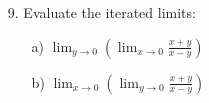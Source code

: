 \documentclass[11pt]{amsbook}
\begin{document}
\begin{enumerate}
            
    \item[9.] Evaluate the iterated limits:
    
        \begin{multicols}{2}
            \begin{enumerate}
                \item [a)] $ \lim_{y \to 0}( \lim_{x \to 0} \frac{x+y}{x-y} )   $  
                \item [b)] $ \lim_{x \to 0}( \lim_{y \to 0} \frac{x+y}{x-y} )   $  
            \end{enumerate}
        \end{multicols}
            
    
    
    
    
    
\end{enumerate}
\end{document}
